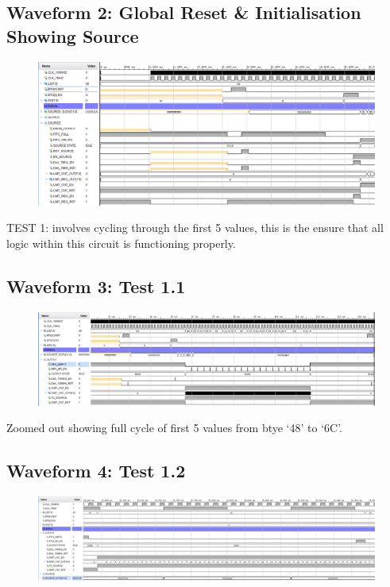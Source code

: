 \documentclass[11pt]{report}
\begin{document}
\subsection*{Waveform 2: Global Reset \& Initialisation Showing Source}
\begin{figure}[H]
       \includegraphics[width=\columnwidth]{Assets/Source_Reset.png}
\end{figure}

TEST 1: involves cycling through the first 5 values, this is the ensure that
all logic within this circuit is functioning properly.

\subsection*{Waveform 3: Test 1.1 }
\begin{figure}[H]
       \includegraphics[width=\columnwidth]{Assets/Test1_1.png}
\end{figure}

Zoomed out showing full cycle of first 5 values from btye `48' to `6C'.

\subsection*{Waveform 4: Test 1.2 }
\begin{figure}[H]
       \includegraphics[width=\columnwidth]{Assets/Test1_2.png}
\end{figure}
\end{document}
